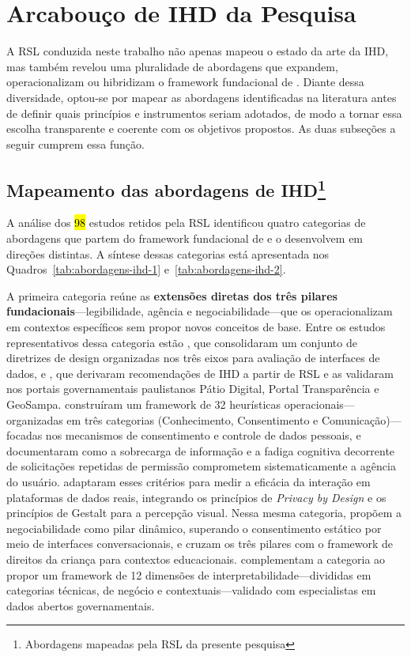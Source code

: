 \documentclass[
	12pt,				%
	oneside,			%
	a4paper,			%
	english,			%
	brazil				%
	]{abntex2ppgsi}
\begin{document}
    \section{Arcabouço de IHD da Pesquisa}\label{ArcabIHD}

    A RSL conduzida neste trabalho não apenas mapeou o estado da arte da IHD, mas também revelou uma pluralidade de abordagens que expandem, operacionalizam ou hibridizam o framework fundacional de . Diante dessa diversidade, optou-se por mapear as abordagens identificadas na literatura antes de definir quais princípios e instrumentos seriam adotados, de modo a tornar essa escolha transparente e coerente com os objetivos propostos. As duas subseções a seguir cumprem essa função.

    \subsection{Mapeamento das abordagens de IHD\protect\footnote{Abordagens mapeadas pela RSL da presente pesquisa}}

    A análise dos \hl{98} estudos retidos pela RSL identificou quatro categorias de abordagens que partem do framework fundacional de  e o desenvolvem em direções distintas. A síntese dessas categorias está apresentada nos Quadros~\ref{tab:abordagens-ihd-1} e~\ref{tab:abordagens-ihd-2}.

    A primeira categoria reúne as \textbf{extensões diretas dos três pilares fundacionais}---legibilidade, agência e negociabilidade---que os operacionalizam em contextos específicos sem propor novos conceitos de base. Entre os estudos representativos dessa categoria estão , que consolidaram um conjunto de diretrizes de design organizadas nos três eixos para avaliação de interfaces de dados, e , que derivaram recomendações de IHD a partir de RSL e as validaram nos 
    portais governamentais paulistanos Pátio Digital, Portal Transparência e GeoSampa.  construíram um framework de 32 heurísticas operacionais---organizadas em três categorias (Conhecimento, Consentimento e Comunicação)---focadas nos mecanismos de consentimento e controle de dados pessoais, e documentaram como a sobrecarga de informação e a fadiga cognitiva decorrente de solicitações repetidas de permissão comprometem sistematicamente a agência do usuário.  adaptaram 
    esses critérios para medir a eficácia da interação em plataformas de dados reais, integrando os princípios de \textit{Privacy by Design} e os princípios de Gestalt para a percepção visual. Nessa mesma categoria,  propõem a negociabilidade como pilar dinâmico, superando o consentimento estático por meio de interfaces conversacionais, e  cruzam os três pilares com o framework de direitos da criança para contextos educacionais.  complementam a categoria ao propor um framework de 12 dimensões de interpretabilidade---divididas em categorias técnicas, de negócio e contextuais---validado com especialistas em dados abertos governamentais.
\end{document}
